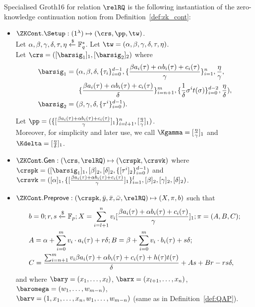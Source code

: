 \begin{definition}
\label{insta:sg16} 
Specialised Groth16 for relation $\relRQ$ is the following instantiation of the zero-knowledge continuation notion from Definition~\ref{def:zk_cont}:
\begin{itemize}
\item $\ZKCont.\Setup: (1^{\lambda}) \mapsto (\crs, \pp, \tw)$. \\ 
\noindent Let $\alpha, \beta, \gamma, \delta, \tau, \eta  \xleftarrow{\$} \mathbb{F}_q^{*}$. Let $\tw = (\alpha, \beta, \gamma, \delta, \tau, \eta)$. \\ 
Let $\crs = ([\barsig_1]_1, [\barsig_2]_2)$ where 
\begin{align*}
\barsig_1 = (&\alpha, \beta, \delta, \{\tau_i\}_{i=0}^{d-1}, \{\frac{\beta a_i(\tau)+ \alpha b_i(\tau)+ c_i(\tau)}{\gamma}\}_{i=1}^n,  
\frac{\eta}{\gamma}, \\ 
&\{\frac{\beta a_i(\tau)+ \alpha b_i(\tau)+ c_i(\tau)}{\delta} \}_{i=n+1}^m, \{\frac{1}{\delta}\sigma^it(\sigma)\}_{i=0}^{d-2}, 
\frac{\eta}{\delta}), \\
\barsig_2 = (&\beta, \gamma, \delta, \{\tau^i\}_{i=0}^{d-1}). 
\end{align*} 

Let $\pp = ( \{[\frac{\beta a_i(\tau)+ \alpha b_i(\tau)+ c_i(\tau)}{\gamma}]_1 \}_{i=l+1}^{n}, [\frac{\eta}{\gamma}]_1)$. \\
\noindent Moreover, for simplicity and later use, we call $\Kgamma = [\frac{\eta}{\gamma}]_1$  and $\Kdelta = [\frac{\eta}{\delta}]_1$.

\item $\ZKCont.\Gen: (\crs, \relRQ) \mapsto (\crspk, \crsvk)$ where \\
$\crspk = ([\barsig_1]_1, [\beta]_2, [\delta]_2, \{[\tau^i]_2\}_{i=0}^{d-1})$ and \\ 
$\crsvk = ([\alpha]_1, \{ [\frac{\beta a_i(\tau)+ \alpha b_i(\tau)+ c_i(\tau)}{\gamma}]_1\}_{i=1}^{l}, 
[\beta]_2, [\gamma]_2, [\delta]_2)$.  

\item $\ZKCont.\Preprove: (\crspk, \bar{y}, \bar{x}, \bar{\omega}, \relRQ) \mapsto (X, \pi, b)$ such that \\
\begin{align*}
&b = 0; r, s\xleftarrow{\$} \mathbb{F}_p; X = \sum_{i=l+1}^{n} v_i [\frac{\beta a_i(\tau)+ \alpha b_i(\tau)+ c_i(\tau)}{\gamma}]_1; \pi = (A, B, C); \\
&A = \alpha + \sum_{i=0}^{m} v_i \cdot a_i(\tau) + r\delta; B = \beta + \sum_{i=0}^{m} v_i \cdot b_i(\tau) + s\delta; \\ 
&C = \frac{\sum_{i=n+1}^{m} v_i \beta a_i(\tau)+ \alpha b_i(\tau)+ c_i(\tau) + h(\tau)t(\tau)}{\delta}   + As + Br - rs\delta, 
\end{align*}
and where $\bary = (x_1, \ldots, x_l)$, $\barx = (x_{l+1}, \ldots, x_n)$, $\baromega = (w_1, \ldots, w_{m-n})$, \\
$\barv = (1, x_1, \ldots, x_n, w_1, \ldots, w_{m-n})$ (same as in Definition~\ref{def:QAP}).



\end{itemize}
\end{definition}
